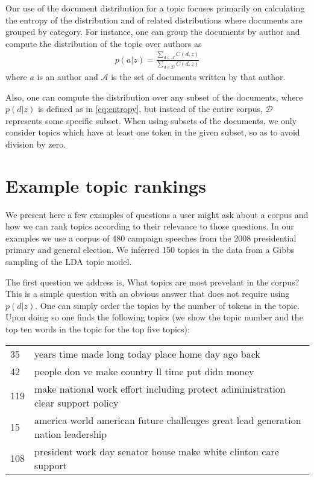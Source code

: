 \documentclass{article}
\begin{document}
Our use of the document distribution for a topic focuses primarily on
calculating the entropy of the distribution and of related distributions where
documents are grouped by category.  For instance, one can group the documents
by author and compute the distribution of the topic over authors as
\begin{align}
  \label{eq:attrentropy}
  p(a|z) = \frac{\sum_{d \in \mathcal{A}} C(d,z)}{\sum_{d \in \mathcal{D}}
  C(d,z)}
\end{align}
where $a$ is an author and $\mathcal{A}$ is the set of documents written by
that author.

Also, one can compute the distribution over any subset of the documents, where
$p(d|z)$ is defined as in \eqref{eq:entropy}, but instead of the entire corpus,
$\mathcal{D}$ represents some specific subset.  When using subsets of the
documents, we only consider topics which have at least one token in the given
subset, so as to avoid division by zero.

\section{Example topic rankings}
\label{sec:examples}

We present here a few examples of questions a user might ask about a corpus and
how we can rank topics according to their relevance to those questions.  In our
examples we use a corpus of 480 campaign speeches from the 2008 presidential
primary and general election.  We inferred 150 topics in the data from a Gibbs
sampling of the LDA topic model.

The first question we address is, What topics are most prevelant in the corpus?
This is a simple question with an obvious answer that does not require using
$p(d|z)$.  One can simply order the topics by the number of tokens in the
topic.  Upon doing so one finds the following topics (we show the topic number
and the top ten words in the topic for the top five topics):

\begin{tabular}{l|l}
  35 & years time made long today place home day ago back \\
  42 & people don ve make country ll time put didn money \\
  119 & make national work effort including protect adiministration clear
	support policy \\
  15 & america world american future challenges great lead generation nation
	leadership \\
  108 & president work day senator house make white clinton care support \\
\end{tabular}
\end{document}
